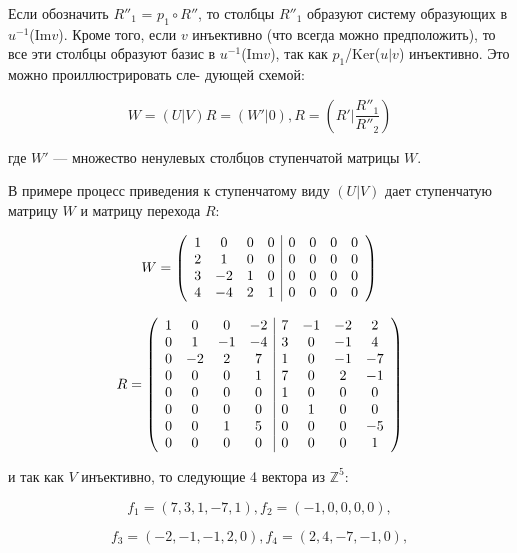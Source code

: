 \documentclass{mai_book}
\begin{document}
{Если обозначить $R''_1$ = $p_1 \circ R''$, то столбцы $R''_{1}$ образуют систему
образующих в $u^{-1}$(Im{$v$}). Кроме того, если $v$ инъективно (что всегда
можно предположить), то все эти столбцы образуют базис в $u^{-1}$(Im{$v$}),
так как $p_{1}$/Ker($u | v$) инъективно. Это можно проиллюстрировать сле-
дующей схемой:

\begin{equation*}
W = (U | V)R = (W' | 0), R = \left(R' | \frac{R''_{1}}{R''_{2}} \right)
\end{equation*}

где $W'$ — множество ненулевых столбцов ступенчатой матрицы $W$.

В примере процесс приведения к ступенчатому виду $(U | V)$ дает
ступенчатую матрицу $W$ и матрицу перехода $R$:

\[ W = {\left( \begin{array}{cccccccc}
1 & 0 & 0 & 0 & \multicolumn{1}{|c}{0} & 0 & 0 & 0 \\
2 & 1 & 0 & 0 & \multicolumn{1}{|c}{0} & 0 & 0 & 0 \\
3 & -2 & 1 & 0 & \multicolumn{1}{|c}{0} & 0 & 0 & 0 \\
4 & -4 & 2 & 1 & \multicolumn{1}{|c}{0} & 0 & 0 & 0
\end{array} \right)} \]

\[ R = {\left( \begin{array}{cccccccc}
1 & 0 & 0 & -2 & \multicolumn{1}{|c}{7} & -1 & -2 & 2 \\
0 & 1 & -1 & -4 & \multicolumn{1}{|c}{3} & 0 & -1 & 4 \\
0 & -2 & 2 & 7 & \multicolumn{1}{|c}{1} & 0 & -1 & -7 \\
0 & 0 & 0 & 1 & \multicolumn{1}{|c}{7} & 0 & 2 & -1 \\
0 & 0 & 0 & 0 & \multicolumn{1}{|c}{1} & 0 & 0 & 0 \\
0 & 0 & 0 & 0 & \multicolumn{1}{|c}{0} & 1 & 0 & 0 \\
0 & 0 & 1 & 5 & \multicolumn{1}{|c}{0} & 0 & 0 & -5 \\
0 & 0 & 0 & 0 & \multicolumn{1}{|c}{0} & 0 & 0 & 1
\end{array} \right)} \]

\noindent и так как $V$ инъективно, то следующие 4 вектора из $\mathbb {Z}^{5}$:

\begin{equation*}
f_1 = (7,3,1,-7,1), f_2 = (-1,0,0,0,0),
\end{equation*}

\begin{equation*}
f_3 = (-2,-1,-1,2,0), f_4 = (2,4,-7,-1,0),
\end{equation*}

}
\end{document}
